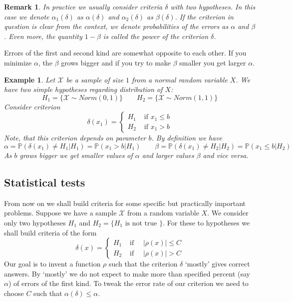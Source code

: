 \documentclass[12pt]{article}
\newtheorem{remark}[theorem]{Remark}
\newtheorem{example}[theorem]{Example}
\begin{document}
\begin{remark} In practice we usually consider criteria $\delta$ with two
    hypotheses. In this case we denote $\alpha_1(\delta)$ as $\alpha(\delta)$
    and $\alpha_2(\delta)$ as $\beta(\delta)$. If the criterion in question is
    clear from the context, we denote probabilities of the errors as $\alpha$
    and $\beta$. Even more, the quantity $1-\beta$ is called the power of the
    criterion $\delta$.
\end{remark}

Errors of the first and second kind are somewhat opposite to each other. If you
minimize $\alpha$, the $\beta$ grows bigger and if you try to make $\beta$
smaller you get larger $\alpha$.

\begin{example} Let $\mathscr{X}$ be a sample of size $1$ from a normal random
    variable $X$. We have two simple hypotheses regarding distribution of $X$:
    $$
        H_1=\{\mathscr{X}\sim Norm(0, 1)\}
        \quad\quad
        H_2=\{\mathscr{X}\sim Norm(1,1)\}
    $$
    Consider criterion
    $$
        \delta(x_1)=
        \begin{cases}
            H_1 & \mbox{ if } x_1\leq b \\
            H_2 & \mbox{ if } x_1> b
        \end{cases}
    $$
    Note, that this criterion depends on parameter $b$. By definition we have
    $$
        \alpha=\mathbb{P}(\delta(x_1)\neq H_1|H_1)=\mathbb{P}(x_1>b|H_1)
        \quad\quad
        \beta=\mathbb{P}(\delta(x_1)\neq H_2|H_2)=\mathbb{P}(x_1\leq b|H_2)
    $$
    As $b$ grows bigger we get smaller values of $\alpha$ and larger values
    $\beta$ and vice versa.
\end{example}


\subsection{Statistical tests}

From now on we shall build criteria for some specific but practically important
problems. Suppose we have a sample $\mathscr{X}$ from a random variable $X$.  We
consider only two hypotheses $H_1$ and $H_2=\{H_1\mbox{ is not true }\}$. For
these to hypotheses we shall build criteria of the form
$$
    \delta(x)=
    \begin{cases}
        H_1 & \mbox{ if }\quad |\rho(x)|\leq C \\
        H_2 & \mbox{ if }\quad |\rho(x)|> C
    \end{cases}
$$
Our goal is to invent a function $\rho$ such that the criterion $\delta$
`mostly' gives correct answers. By `mostly' we do not expect to make more than
specified percent (say $\alpha$) of errors of the first kind. To tweak the error
rate of our criterion we need to choose $C$ such that $\alpha(\delta)\leq
    \alpha$.
\end{document}
